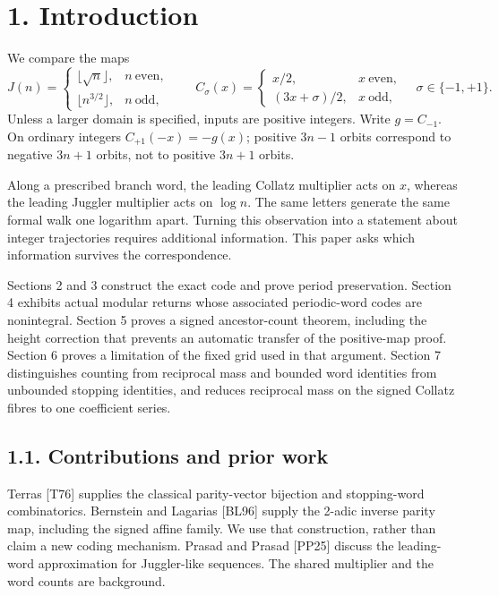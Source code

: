 \documentclass[11pt,a4paper]{article}
\begin{document}
\section{1. Introduction}\label{introduction}

We compare the maps \[
J(n)=
\begin{cases}
\lfloor\sqrt n\rfloor,&n\ \text{even},\\
\lfloor n^{3/2}\rfloor,&n\ \text{odd},
\end{cases}
\qquad
C_\sigma(x)=
\begin{cases}
x/2,&x\ \text{even},\\
(3x+\sigma)/2,&x\ \text{odd},
\end{cases}
\quad \sigma\in\{-1,+1\}.
\] Unless a larger domain is specified, inputs are positive integers.
Write \(g=C_{-1}\). On ordinary integers \(C_{+1}(-x)=-g(x)\); positive
\(3n-1\) orbits correspond to negative \(3n+1\) orbits, not to positive
\(3n+1\) orbits.

Along a prescribed branch word, the leading Collatz multiplier acts on
\(x\), whereas the leading Juggler multiplier acts on \(\log n\). The
same letters generate the same formal walk one logarithm apart. Turning
this observation into a statement about integer trajectories requires
additional information. This paper asks which information survives the
correspondence.

Sections 2 and 3 construct the exact code and prove period preservation.
Section 4 exhibits actual modular returns whose associated periodic-word
codes are nonintegral. Section 5 proves a signed ancestor-count theorem,
including the height correction that prevents an automatic transfer of
the positive-map proof. Section 6 proves a limitation of the fixed grid
used in that argument. Section 7 distinguishes counting from reciprocal
mass and bounded word identities from unbounded stopping identities, and
reduces reciprocal mass on the signed Collatz fibres to one coefficient
series.

\subsection{1.1. Contributions and prior
work}\label{contributions-and-prior-work}

Terras {[}T76{]} supplies the classical parity-vector bijection and
stopping-word combinatorics. Bernstein and Lagarias {[}BL96{]} supply
the 2-adic inverse parity map, including the signed affine family. We
use that construction, rather than claim a new coding mechanism. Prasad
and Prasad {[}PP25{]} discuss the leading-word approximation for
Juggler-like sequences. The shared multiplier and the word counts are
background.
\end{document}
